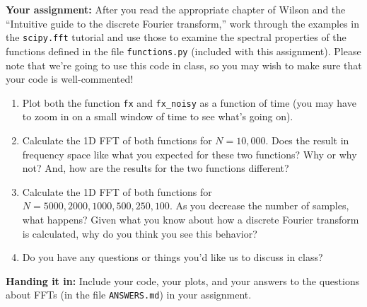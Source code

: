 \documentclass[10pt]{article}
\begin{document}
\noindent
\textbf{Your assignment:}  After you read the appropriate chapter of
Wilson and the ``Intuitive guide to the discrete Fourier transform,''
work through the examples in the \texttt{scipy.fft} tutorial and
use those to examine the spectral properties of the functions defined
in the file \texttt{functions.py} (included with this assignment).
Please note that we're going to use this code in class, so you may
wish to make sure that your code is well-commented!

\begin{enumerate}

\item Plot both the function \texttt{fx} and \texttt{fx\_noisy} as a
function of time (you may have to zoom in on a small window of time to
see what's going on).

\item Calculate the 1D FFT of both functions for $N=10,000$.  Does the
result in frequency space like what you expected for these two
functions?  Why or why not?  And, how are the results for the two
functions different?

\item Calculate the 1D FFT of both functions for $N=5000, 2000, 1000,
500, 250, 100$.  As you decrease the number of samples, what happens?
Given what you know about how a discrete Fourier transform is
calculated, why do you think you see this behavior?

\item Do you have any questions or things you'd like us to discuss in
class?

\end{enumerate}

\noindent
\textbf{Handing it in:}
Include your code, your plots, and your answers to the questions about
FFTs (in the file \texttt{ANSWERS.md}) in your assignment.
\end{document}
